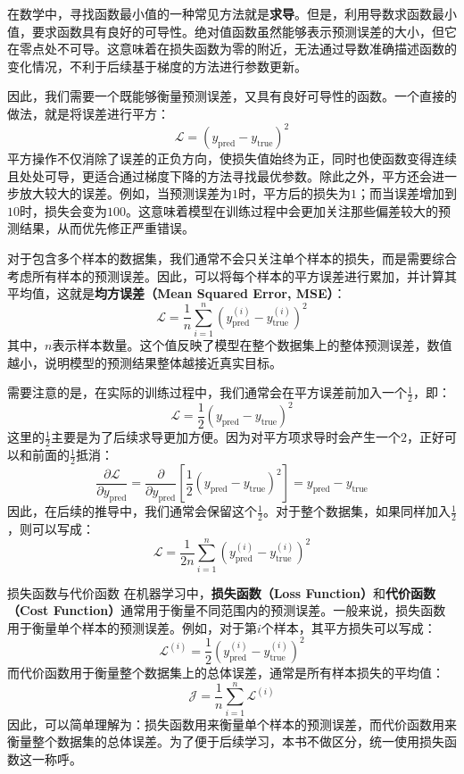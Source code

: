 在数学中，寻找函数最小值的一种常见方法就是\textbf{求导}。但是，利用导数求函数最小值，要求函数具有良好的可导性。绝对值函数虽然能够表示预测误差的大小，但它在零点处不可导。这意味着在损失函数为零的附近，无法通过导数准确描述函数的变化情况，不利于后续基于梯度的方法进行参数更新。

因此，我们需要一个既能够衡量预测误差，又具有良好可导性的函数。一个直接的做法，就是将误差进行平方：
$$
\mathcal{L}=(y_{\text{pred}}-y_{\text{true}})^2
$$
平方操作不仅消除了误差的正负方向，使损失值始终为正，同时也使函数变得连续且处处可导，更适合通过梯度下降的方法寻找最优参数。除此之外，平方还会进一步放大较大的误差。例如，当预测误差为$1$时，平方后的损失为$1$；而当误差增加到$10$时，损失会变为$100$。这意味着模型在训练过程中会更加关注那些偏差较大的预测结果，从而优先修正严重错误。

对于包含多个样本的数据集，我们通常不会只关注单个样本的损失，而是需要综合考虑所有样本的预测误差。因此，可以将每个样本的平方误差进行累加，并计算其平均值，这就是\textbf{均方误差（Mean Squared Error, MSE）}：
$$
\mathcal{L} = \frac{1}{n} \sum_{i=1}^{n} \left( y_{\text{pred}}^{(i)} - y_{\text{true}}^{(i)} \right)^2
$$
其中，$n$表示样本数量。这个值反映了模型在整个数据集上的整体预测误差，数值越小，说明模型的预测结果整体越接近真实目标。

需要注意的是，在实际的训练过程中，我们通常会在平方误差前加入一个$\frac{1}{2}$，即：
$$
\mathcal{L} = \frac{1}{2} \left(y_{\text{pred}} - y_{\text{true}} \right)^2
$$
这里的$\frac{1}{2}$主要是为了后续求导更加方便。因为对平方项求导时会产生一个$2$，正好可以和前面的$\frac{1}{2}$抵消：
$$
\frac{\partial\mathcal{L}} {\partial y_{\text{pred}}} = \frac{\partial}{\partial y_{\text{pred}}} \left[ \frac{1}{2} \left(y_{\text{pred}}-y_{\text{true}}\right)^2 \right] = y_{\text{pred}}-y_{\text{true}}
$$
因此，在后续的推导中，我们通常会保留这个$\frac{1}{2}$。对于整个数据集，如果同样加入$\frac{1}{2}$，则可以写成：
$$
\mathcal{L} = \frac{1}{2n} \sum_{i=1}^{n} \left( y_{\text{pred}}^{(i)}-y_{\text{true}}^{(i)} \right)^2
$$

\begin{orangeBox}{损失函数与代价函数}
在机器学习中，\textbf{损失函数（Loss Function）}和\textbf{代价函数（Cost Function）}通常用于衡量不同范围内的预测误差。一般来说，损失函数用于衡量单个样本的预测误差。例如，对于第$i$个样本，其平方损失可以写成：
$$
\mathcal{L}^{(i)}=\frac{1}{2}\left(y_{\text{pred}}^{(i)}-y_{\text{true}}^{(i)}\right)^2
$$
而代价函数用于衡量整个数据集上的总体误差，通常是所有样本损失的平均值：
$$
\mathcal{J}=\frac{1}{n}\sum_{i=1}^{n}\mathcal{L}^{(i)}
$$
因此，可以简单理解为：损失函数用来衡量单个样本的预测误差，而代价函数用来衡量整个数据集的总体误差。为了便于后续学习，本书不做区分，统一使用损失函数这一称呼。
\end{orangeBox}

